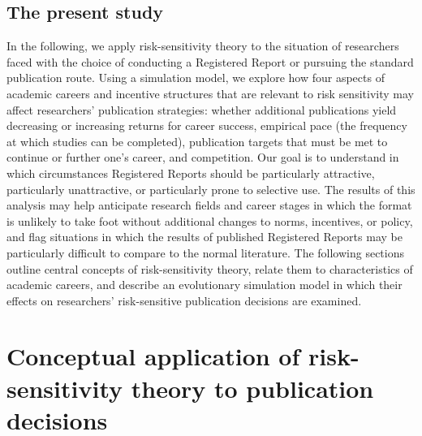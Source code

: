 \documentclass[
  ,man,mask,floatsintext]{apa6}
\begin{document}
\hypertarget{the-present-study}{%
\subsection{The present study}\label{the-present-study}}

In the following, we apply
risk-sensitivity theory to
the situation of researchers faced with the choice of conducting a Registered Report or pursuing the standard publication route.
Using a simulation model, we explore how four aspects of academic careers and incentive structures that are relevant to risk sensitivity may affect researchers' publication strategies:
whether additional publications yield decreasing or increasing returns for career success, empirical pace (the frequency at which studies can be completed), publication targets that must be met to continue or further one's career, and competition.
Our goal is to understand in which circumstances Registered Reports should be particularly attractive, particularly unattractive, or particularly prone to selective use.
The results of this analysis may help anticipate research fields and career stages in which the format is unlikely to take foot without additional changes to norms, incentives, or policy, and flag situations in which the results of published Registered Reports may be particularly difficult to compare to the normal literature.
The following sections outline central concepts of risk-sensitivity theory, relate them to characteristics of academic careers, and describe an evolutionary simulation model in which their effects on researchers' risk-sensitive publication decisions are examined.

\hypertarget{conceptual-application-of-risk-sensitivity-theory-to-publication-decisions}{%
\section{Conceptual application of risk-sensitivity theory to publication decisions}\label{conceptual-application-of-risk-sensitivity-theory-to-publication-decisions}}
\end{document}

